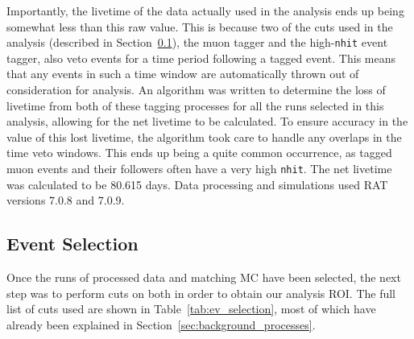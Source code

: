 Importantly, the livetime of the data actually used in the analysis ends up being somewhat less than this raw value. This is because two of the cuts used in the analysis (described in Section~\ref{sec:event_selection}), the muon tagger and the high-\texttt{nhit} event tagger, also veto events for a time period following a tagged event. This means that any events in such a time window are automatically thrown out of consideration for analysis. An algorithm was written to determine the loss of livetime from both of these tagging processes for all the runs selected in this analysis, allowing for the net livetime to be calculated. To ensure accuracy in the value of this lost livetime, the algorithm took care to handle any overlaps in the time veto windows. This ends up being a quite common occurrence, as tagged muon events and their followers often have a very high \texttt{nhit}. The net livetime was calculated to be 80.615 days. Data processing and simulations used RAT versions 7.0.8 and 7.0.9.


\subsection{Event Selection}\label{sec:event_selection}
Once the runs of processed data and matching MC have been selected, the next step was to perform cuts on both in order to obtain our analysis ROI. The full list of cuts used are shown in Table~\ref{tab:ev_selection}, most of which have already been explained in Section~\ref{sec:background_processes}.

